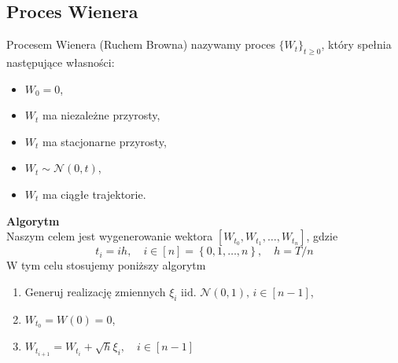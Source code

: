 \documentclass[12pt]{mwart}
\begin{document}
	\subsection{Proces Wienera}
	\noindent Procesem Wienera (Ruchem Browna) nazywamy proces $\{W_t\}_{t\geqslant0}$, który spełnia następujące własności:
	\begin{itemize}[leftmargin=10mm, label=\small$\bullet$]%
		\item $W_0=0$,
		\item $W_t$ ma niezależne przyrosty,
		\item $W_t$ ma stacjonarne przyrosty,
		\item $W_t \sim \mathcal{N}(0, t)$,
		\item $W_t$ ma ciągłe trajektorie.
	\end{itemize}	
	\noindent \textbf{Algorytm}\\
	\noindent Naszym celem jest wygenerowanie wektora $\left[W_{t_0}, W_{t_1}, \dots, W_{t_n}\right]$, gdzie
	\begin{equation*}
		t_i=ih, \quad i\in\left[n\right]=\left\{0, 1, \dots, n\right\}, \quad h=T/n
	\end{equation*}
	W tym celu stosujemy poniższy algorytm
	\begin{enumerate}[leftmargin=10mm]
		\item Generuj realizację zmiennych $\xi_i\text{ iid. }\mathcal{N}(0,1), \,i\in\left[n-1\right]$,
		\item $W_{t_0}=W\left(0\right)=0$,
		\item $W_{t_{i+1}} = W_{t_{i}}+\sqrt{h}\xi_i,\quad i\in\left[n-1\right]$%
	\end{enumerate}
\end{document}
